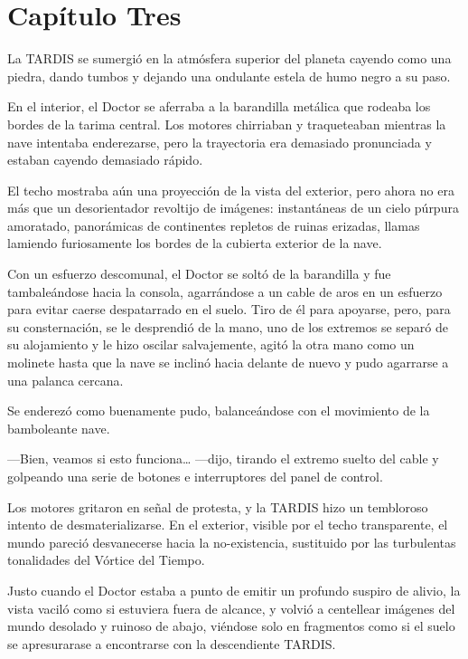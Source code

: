 \chapter*{Capítulo Tres}

La TARDIS se sumergió en la atmósfera superior del planeta cayendo como una piedra, dando tumbos y dejando una ondulante estela de humo negro a su paso. 

En el interior, el Doctor se aferraba a la barandilla metálica que rodeaba los bordes de la tarima central. Los motores chirriaban y traqueteaban mientras la nave intentaba enderezarse, pero la trayectoria era demasiado pronunciada y estaban cayendo demasiado rápido. 

El techo mostraba aún una proyección de la vista del exterior, pero ahora no era más que un desorientador revoltijo de imágenes: instantáneas de un cielo púrpura amoratado, panorámicas de continentes repletos de ruinas erizadas, llamas lamiendo furiosamente los bordes de la cubierta exterior de la nave. 

Con un esfuerzo descomunal, el Doctor se soltó de la barandilla y fue tambaleándose hacia la consola, agarrándose a un cable de aros en un esfuerzo para evitar caerse despatarrado en el suelo. Tiro de él para apoyarse, pero, para su consternación, se le desprendió de la mano, uno de los extremos se separó de su alojamiento y le hizo oscilar salvajemente, agitó la otra mano como un molinete hasta que la nave se inclinó hacia delante de nuevo y pudo agarrarse a una palanca cercana. 

Se enderezó como buenamente pudo, balanceándose con el movimiento de la bamboleante nave. 



—Bien, veamos si esto funciona… —dijo, tirando el extremo suelto del cable y golpeando una serie de botones e interruptores del panel de control. 

Los motores gritaron en señal de protesta, y la TARDIS hizo un tembloroso intento de desmaterializarse. En el exterior, visible por el techo transparente, el mundo pareció desvanecerse hacia la no-existencia, sustituido por las turbulentas tonalidades del Vórtice del Tiempo. 

Justo cuando el Doctor estaba a punto de emitir un profundo suspiro de alivio, la vista vaciló como si estuviera fuera de alcance, y volvió a centellear imágenes del mundo desolado y ruinoso de abajo, viéndose solo en fragmentos como si el suelo se apresurarase a encontrarse con la descendiente TARDIS. 

